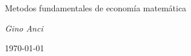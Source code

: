 \documentclass[12pt,a4paper]{report}
\begin{document}
\begin{titlepage}
    \centering
    \vspace*{\fill}
    {\Huge \ttfamily Metodos fundamentales de economía matemática \par}
    \vspace{2cm}
    {\large \itshape Gino Anci \par}
    {\small\today\par}
    \vspace*{\fill}
\end{titlepage}

\tableofcontents



\end{document}
